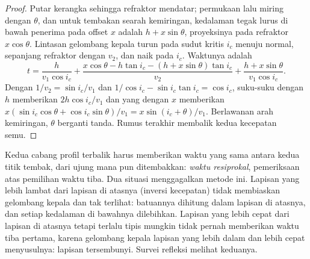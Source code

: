 \begin{proof}
Putar kerangka sehingga refraktor mendatar; permukaan lalu miring dengan
$\theta$, dan untuk tembakan searah kemiringan, kedalaman tegak lurus di bawah penerima pada
offset $x$ adalah $h + x\sin\theta$, proyeksinya pada refraktor
$x\cos\theta$. Lintasan gelombang kepala turun pada sudut kritis $i_c$ menuju
normal, sepanjang refraktor dengan $v_2$, dan naik pada $i_c$. Waktunya adalah
\[
  t = \frac{h}{v_1\cos i_c} + \frac{x\cos\theta - h\tan i_c - (h + x\sin\theta)\tan i_c}{v_2}
  + \frac{h + x\sin\theta}{v_1\cos i_c}.
\]
Dengan $1/v_2 = \sin i_c/v_1$ dan $1/\cos i_c - \sin i_c\tan i_c = \cos i_c$,
suku-suku dengan $h$ memberikan $2h\cos i_c/v_1$ dan yang dengan $x$ memberikan
$x(\sin i_c\cos\theta + \cos i_c\sin\theta)/v_1 = x\sin(i_c + \theta)/v_1$.
Berlawanan arah kemiringan, $\theta$ berganti tanda. Rumus terakhir membalik kedua
kecepatan semu.
\end{proof}

Kedua cabang profil terbalik harus memberikan waktu yang sama antara kedua
titik tembak, dari ujung mana pun ditembakkan: \emph{waktu resiprokal}, pemeriksaan atas
pemilihan waktu tiba. Dua situasi menggagalkan metode ini. Lapisan yang lebih lambat
dari lapisan di atasnya (inversi kecepatan) tidak membiaskan gelombang kepala dan tak terlihat: batuannya
dihitung dalam lapisan di atasnya, dan setiap kedalaman di bawahnya dilebihkan. Lapisan
yang lebih cepat dari lapisan di atasnya tetapi terlalu tipis mungkin tidak pernah memberikan waktu tiba pertama, karena
gelombang kepala lapisan yang lebih dalam dan lebih cepat menyusulnya: lapisan tersembunyi. Survei
refleksi melihat keduanya.

